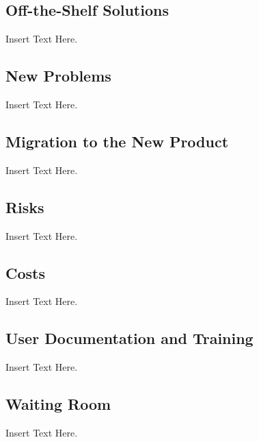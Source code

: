 \documentclass [12pt]{article}
\begin{document}
\subsection{\large Off-the-Shelf Solutions}
	Insert Text Here.

\subsection{\large New Problems}
	Insert Text Here.

\subsection{\large Migration to the New Product} 
	Insert Text Here.

\subsection{\large Risks}
	Insert Text Here.
	
\subsection{\large Costs}	
	Insert Text Here.

\subsection{\large User Documentation and Training}
	Insert Text Here.

\subsection{\large Waiting Room}
	Insert Text Here. 
\end{document}
